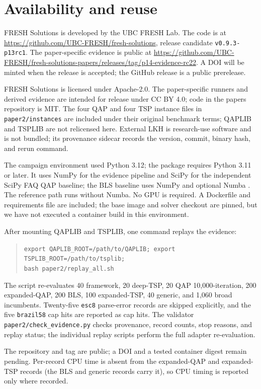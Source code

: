 \documentclass[10pt]{article}
\begin{document}
\section{Availability and reuse}

FRESH Solutions is developed by the UBC FRESH Lab. The code is at
\url{https://github.com/UBC-FRESH/fresh-solutions}, release candidate
\texttt{v0.9.3-p13rc1}. The paper-specific evidence is public at
\url{https://github.com/UBC-FRESH/fresh-solutions-papers/releases/tag/p14-evidence-rc22}. A DOI will be
minted when the release is accepted; the GitHub release is a public prerelease.

FRESH Solutions is licensed under Apache-2.0. The paper-specific runners and derived evidence are
intended for release under CC BY 4.0; code in the papers repository is MIT. The four QAP and four TSP instance files in \texttt{paper2/instances} are included under their original
benchmark terms; QAPLIB and TSPLIB are not relicensed here. External LKH is research-use software
and is not bundled; its provenance sidecar records the version, commit, binary hash, and rerun
command.

The campaign environment used Python 3.12; the package requires Python 3.11 or later. It uses NumPy
\citep{harris2020} for the evidence pipeline and SciPy \citep{virtanen2020} for the independent
SciPy FAQ QAP baseline; the BLS baseline uses NumPy and optional Numba \citep{lam2015}. The
reference path runs without Numba. No GPU
is required. A Dockerfile and requirements file are included; the base image and solver checkout are
pinned, but we have not executed a container build in this environment.

After mounting QAPLIB and TSPLIB, one command replays the evidence:
\begin{quote}
\small
\texttt{export QAPLIB\_ROOT=/path/to/QAPLIB; export TSPLIB\_ROOT=/path/to/tsplib;}\\
\texttt{bash paper2/replay\_all.sh}
\end{quote}
The script re-evaluates 40 framework, 20 deep-TSP, 20 QAP 10,000-iteration, 200 expanded-QAP, 200 BLS,
100 expanded-TSP, 40 generic, and 1,060 broad incumbents. Twenty-five \texttt{esc8} parse-error records are skipped
explicitly, and the five \texttt{brazil58} cap hits are reported as cap hits. The validator
\texttt{paper2/check\_evidence.py} checks provenance, record counts, stop reasons, and replay status;
the individual replay scripts perform the full adapter re-evaluation.

The repository and tag are public; a DOI and a tested container digest remain pending. Per-record
CPU time is absent from the expanded-QAP and expanded-TSP records (the BLS and generic records carry
it), so CPU timing is reported only where recorded.
\end{document}
